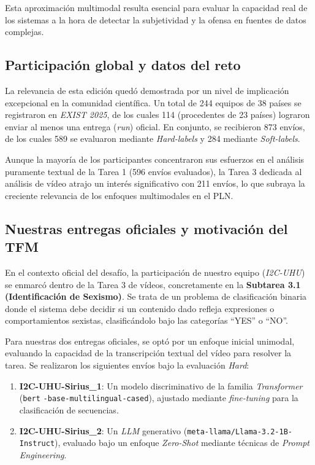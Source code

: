 Esta aproximación multimodal resulta esencial para evaluar la capacidad real de los sistemas a la hora de detectar la subjetividad y la ofensa en fuentes de datos complejas.

\subsection*{Participación global y datos del reto}
\label{subsec:ParticipacionGlobalYDatosDelReto}
La relevancia de esta edición quedó demostrada por un nivel de implicación excepcional en la comunidad científica. Un total de 244 equipos de 38 países se registraron en \textit{EXIST 2025}, de los cuales 114 (procedentes de 23 países) lograron enviar al menos una entrega (\textit{run}) oficial. En conjunto, se recibieron 873 envíos, de los cuales 589 se evaluaron mediante \textit{Hard-labels} y 284 mediante \textit{Soft-labels}.

Aunque la mayoría de los participantes concentraron sus esfuerzos en el análisis puramente textual de la Tarea 1 (596 envíos evaluados), la Tarea 3 dedicada al análisis de vídeo atrajo un interés significativo con 211 envíos, lo que subraya la creciente relevancia de los enfoques multimodales en el PLN. 

\subsection*{Nuestras entregas oficiales y motivación del TFM}
\label{subsec:NuestrasEntregasOficialesYMotivacionDelTFM}
En el contexto oficial del desafío, la participación de nuestro equipo (\textit{I2C-UHU}) se enmarcó dentro de la Tarea 3 de vídeos, concretamente en la \textbf{Subtarea 3.1 (Identificación de Sexismo)}. Se trata de un problema de clasificación binaria donde el sistema debe decidir si un contenido dado refleja expresiones o comportamientos sexistas, clasificándolo bajo las categorías ``YES'' o ``NO''.

Para nuestras dos entregas oficiales, se optó por un enfoque inicial unimodal, evaluando la capacidad de la transcripción textual del vídeo para resolver la tarea. Se realizaron los siguientes envíos bajo la evaluación \textit{Hard}:
\begin{enumerate}
    \item \textbf{I2C-UHU-Sirius\_1}: Un modelo discriminativo de la familia \textit{Transformer} (\texttt{bert} \texttt{-base-multilingual-cased}), ajustado mediante \textit{fine-tuning} para la clasificación de secuencias.
    \item \textbf{I2C-UHU-Sirius\_2}: Un \textit{LLM} generativo (\texttt{meta-llama/Llama-3.2-1B-Instruct}), evaluado bajo un enfoque \textit{Zero-Shot} mediante técnicas de \textit{Prompt Engineering}.  
\end{enumerate}

